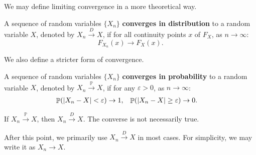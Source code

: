 \documentclass{huhtakm-template-book-v2}
\DeclareMathOperator{\prob}{\mathbb{P}}
\begin{document}
    We may define limiting convergence in a more theoretical way.
    \begin{defn}
        A sequence of random variables $\{X_{n}\}$ \textbf{converges in distribution} to a random variable $X$, denoted by $X_{n} \xrightarrow{D} X$, if for all continuity points $x$ of $F_{X}$, as $n \to \infty$:
        \begin{equation*}
            F_{X_{n}}(x) \to F_{X}(x).
        \end{equation*}
    \end{defn}
    We also define a stricter form of convergence.
    \begin{defn}
        A sequence of random variables $\{X_{n}\}$ \textbf{converges in probability} to a random variable $X$, denoted by $X_{n} \xrightarrow{\prob} X$, if for any $\varepsilon > 0$, as $n \to \infty$:
        \begin{align*}
            \prob(\abs{X_{n} - X} < \varepsilon) &\to 1, & \prob(\abs{X_{n} - X} \geq \varepsilon) &\to 0.
        \end{align*}
    \end{defn}
    \begin{rem}
        If $X_{n} \xrightarrow{\prob} X$, then $X_{n} \xrightarrow{D} X$. The converse is not necessarily true.
    \end{rem}
    \begin{rem}
        After this point, we primarily use $X_{n} \xrightarrow{D} X$ in most cases. For simplicity, we may write it as $X_{n} \to X$.
    \end{rem}
\end{document}
